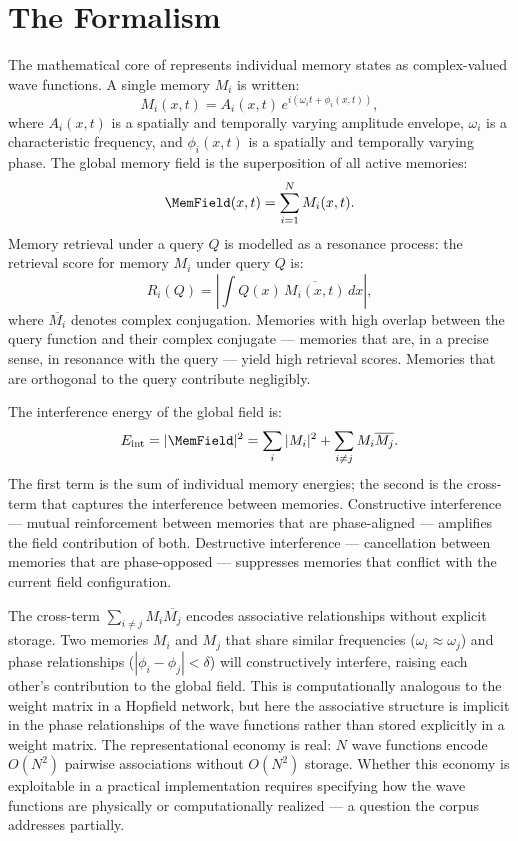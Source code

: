 \section{The \MEMeight{} Formalism}
\label{sec:mem8-formalism}

The mathematical core of \MEMeight{} represents individual memory
states as complex-valued wave functions. A single memory $M_i$ is
written:
\[
  M_i(x,t) = A_i(x,t)\,e^{i(\omega_i t + \phi_i(x,t))},
\]
where $A_i(x,t)$ is a spatially and temporally varying amplitude
envelope, $\omega_i$ is a characteristic frequency, and
$\phi_i(x,t)$ is a spatially and temporally varying phase. The
global memory field is the superposition of all active memories:
\[
  \MemField(x,t) = \sum_{i=1}^{N} M_i(x,t).
\]
Memory retrieval under a query $Q$ is modelled as a resonance
process: the retrieval score for memory $M_i$ under query $Q$ is:
\[
  R_i(Q) = \left|\int Q(x)\,\overline{M_i(x,t)}\,dx\right|,
\]
where $\overline{M_i}$ denotes complex conjugation. Memories with
high overlap between the query function and their complex conjugate
--- memories that are, in a precise sense, in resonance with the
query --- yield high retrieval scores. Memories that are orthogonal
to the query contribute negligibly.

The interference energy of the global field is:
\[
  E_{\mathrm{int}} = |\MemField|^2
  = \sum_i |M_i|^2 + \sum_{i \neq j} M_i\overline{M_j}.
\]
The first term is the sum of individual memory energies; the second
is the cross-term that captures the interference between memories.
Constructive interference --- mutual reinforcement between memories
that are phase-aligned --- amplifies the field contribution of both.
Destructive interference --- cancellation between memories that are
phase-opposed --- suppresses memories that conflict with the current
field configuration.

\begin{technote}
The cross-term $\sum_{i \neq j} M_i\overline{M_j}$ encodes
associative relationships without explicit storage. Two memories
$M_i$ and $M_j$ that share similar frequencies ($\omega_i \approx
\omega_j$) and phase relationships ($|\phi_i - \phi_j| < \delta$)
will constructively interfere, raising each other's contribution
to the global field. This is computationally analogous to the
weight matrix in a Hopfield network, but here the associative
structure is implicit in the phase relationships of the wave
functions rather than stored explicitly in a weight matrix. The
representational economy is real: $N$ wave functions encode
$O(N^2)$ pairwise associations without $O(N^2)$ storage. Whether
this economy is exploitable in a practical implementation requires
specifying how the wave functions are physically or computationally
realized --- a question the corpus addresses partially.
\end{technote}

